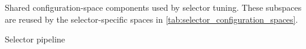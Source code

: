 \begin{table}[!htbp]
  \centering
  \caption[Shared selector configuration spaces]{Shared configuration-space components used by selector tuning. These subspaces are reused by the selector-specific spaces in \autoref{tab:selector_configuration_spaces}.}
  \label{tab:shared_configuration_spaces}
  \scriptsize
  \begin{subtable}[t]{0.48\textwidth}
    \centering
    \caption{Selector pipeline}
  \end{subtable}
  \hfill
  \begin{subtable}[t]{0.48\textwidth}
    \centering
    \caption{Feature processing}
  \end{subtable}


\end{table}
